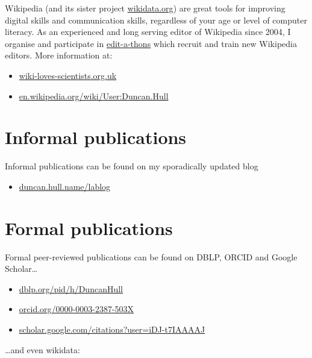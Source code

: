 \documentclass[12pt,]{book}
\providecommand{\tightlist}{%
  \setlength{\itemsep}{0pt}\setlength{\parskip}{0pt}}
\begin{document}
Wikipedia (and its sister project \href{https://www.wikidata.org}{wikidata.org}) are great tools for improving digital skills and communication skills, regardless of your age or level of computer literacy. As an experienced and long serving editor of Wikipedia since 2004, I organise and participate in \href{https://en.wikipedia.org/wiki/Edit-a-thon}{edit-a-thons} which recruit and train new Wikipedia editors. More information at:

\begin{itemize}
\tightlist
\item
  \href{https://wiki-loves-scientists.org.uk/}{wiki-loves-scientists.org.uk}
\item
  \href{https://en.wikipedia.org/wiki/User:Duncan.Hull}{en.wikipedia.org/wiki/User:Duncan.Hull}
\end{itemize}

\hypertarget{informal-publications}{%
\section{Informal publications}\label{informal-publications}}

Informal publications can be found on my sporadically updated blog

\begin{itemize}
\tightlist
\item
  \href{https://duncan.hull.name/lablog/}{duncan.hull.name/lablog}
\end{itemize}

\hypertarget{formal-publications}{%
\section{Formal publications}\label{formal-publications}}

Formal peer-reviewed publications can be found on DBLP, ORCID and Google Scholar\ldots{}

\begin{itemize}
\tightlist
\item
  \href{https://dblp.org/pid/h/DuncanHull}{dblp.org/pid/h/DuncanHull}
\item
  \href{https://orcid.org/0000-0003-2387-503X}{orcid.org/0000-0003-2387-503X}
\item
  \href{https://scholar.google.com/citations?user=iDJ-t7IAAAAJ}{scholar.google.com/citations?user=iDJ-t7IAAAAJ}
\end{itemize}

\ldots{}and even wikidata:
\end{document}
